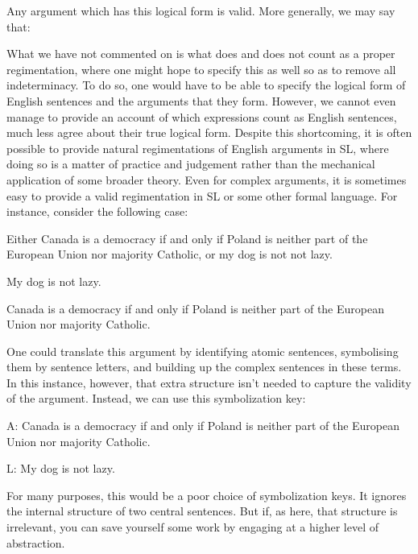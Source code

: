 Any argument which has this logical form is valid.
More generally, we may say that:


What we have not commented on is what does and does not count as a proper regimentation, where one might hope to specify this as well so as to remove all indeterminacy.
To do so, one would have to be able to specify the logical form of English sentences and the arguments that they form.
However, we cannot even manage to provide an account of which expressions count as English sentences, much less agree about their true logical form.
Despite this shortcoming, it is often possible to provide natural regimentations of English arguments in SL, where doing so is a matter of practice and judgement rather than the mechanical application of some broader theory.
Even for complex arguments, it is sometimes easy to provide a valid regimentation in SL or some other formal language.
For instance, consider the following case:

\begin{earg}
  \item Either Canada is a democracy if and only if Poland is neither part of the European Union nor majority Catholic, or my dog is not not lazy.
  \item My dog is not lazy.
  \item[\therefore] Canada is a democracy if and only if Poland is neither part of the European Union nor majority Catholic.
\end{earg}

One could translate this argument by identifying atomic sentences, symbolising them by sentence letters, and building up the complex sentences in these terms.
In this instance, however, that extra structure isn't needed to capture the validity of the argument.
Instead, we can use this symbolization key:

\begin{ekey}
\item[A:] Canada is a democracy if and only if Poland is neither part of the European Union nor majority Catholic.
\item[L:] My dog is not lazy.
\end{ekey}

For many purposes, this would be a poor choice of symbolization keys.
It ignores the internal structure of two central sentences.
But if, as here, that structure is irrelevant, you can save yourself some work by engaging at a higher level of abstraction.




